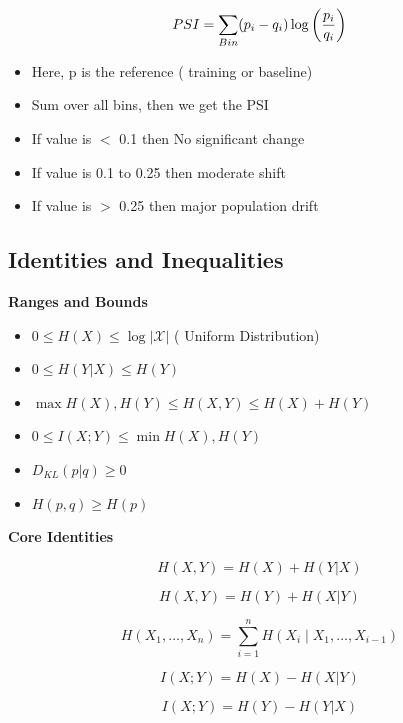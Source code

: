 \documentclass[10pt,a4paper]{article}
\begin{document}
	$$	\Large PSI = \sum_{Bin} (p_i - q_i)  \log\left(\frac{p_i}{q_i}\right)
	$$
	\begin{itemize}
		\item Here, p is the reference ( training or baseline)
		\item Sum over all bins, then we get the PSI
		\item If value is $<$ 0.1 then No significant change
		\item If value is 0.1 to 0.25 then moderate shift
		\item If value is $>$ 0.25 then major population drift
	\end{itemize}

	\subsection{Identities and Inequalities}
	
	\textbf{Ranges and Bounds}
	
	\begin{itemize}
	\item $0 \le H(X) \le \log |\mathcal{X}|$ ( Uniform Distribution)
	\item $0 \le H(Y|X) \le H(Y)$
	\item $\max{H(X), H(Y)} \le H(X,Y) \le H(X) + H(Y)$
	\item $0 \le I(X;Y) \le \min{H(X), H(Y)}$
	\item $D_{KL}(p | q) \ge 0$
	\item $H(p,q) \ge H(p)$
	\end{itemize}
	
	\vspace{0.5em}
	
	\textbf{Core Identities}
	
	\begin{equation*}
	H(X,Y) = H(X) + H(Y|X)
	\end{equation*}
	
	\begin{equation*}
	H(X,Y) = H(Y) + H(X|Y)
	\end{equation*}
	
	\begin{equation*}
	H(X_1, \dots, X_n) = \sum_{i=1}^n H(X_i \mid X_1, \dots, X_{i-1})
	\end{equation*}
	
	\begin{equation*}
	I(X;Y) = H(X) - H(X|Y)
	\end{equation*}
	
	\begin{equation*}
	I(X;Y) = H(Y) - H(Y|X)
	\end{equation*}
	
\end{document}
